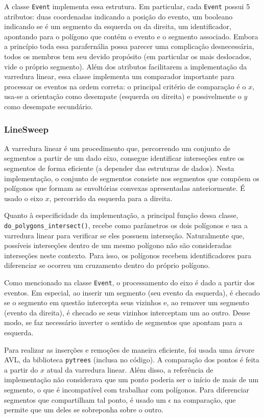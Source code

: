 \documentclass{article}
\begin{document}
A classe \texttt{Event} implementa essa estrutura. Em particular, cada \texttt{Event} possui 5 atributos: duas coordenadas indicando a posição do evento, um booleano indicando se é um segmento da esquerda ou da direita, um identificador, apontando para o polígono que contém o evento e o segmento associado. Embora a princípio toda essa parafernália possa parecer uma complicação desnecessária, todos os membros tem seu devido propósito (em particular os mais deslocados, vide o próprio segmento). Além dos atributos facilitarem a implementação da varredura linear, essa classe implementa um comparador importante para processar os eventos na ordem correta: o principal critério de comparação é o \( x \), usa-se a orientação como desempate (esquerda ou direita) e possivelmente o \( y \) como desempate secundário.

\subsubsection{LineSweep}

A varredura linear é um procedimento que, percorrendo um conjunto de segmentos a partir de um dado eixo, consegue identificar interseções entre os segmentos de forma eficiente (a depender das estruturas de dados). Nesta implementação, o conjunto de segmentos consiste nos segmentos que compõem os polígonos que formam as envoltórias convexas apresentadas anteriormente. É usado o eixo \( x \), percorrido da esquerda para a direita.

Quanto à especificidade da implementação, a principal função dessa classe, \texttt{do\_polygons\_intersect()}, recebe como parâmetros os dois polígonos e usa a varredura linear para verificar se eles possuem interseção. Naturalmente que, possíveis interseções dentro de um mesmo polígono não são consideradas interseções neste contexto. Para isso, os polígonos recebem identificadores para diferenciar se ocorreu um cruzamento dentro do próprio polígono.

Como mencionado na classe \texttt{Event}, o processamento do eixo é dado a partir dos eventos. Em especial, ao inserir um segmento (seu evento da esquerda), é checado se o segmento em questão intercepta seus vizinhos e, ao remover um segmento (evento da direita), é checado se seus vizinhos interceptam um ao outro. Desse modo, se faz necessário inverter o sentido de segmentos que apontam para a esquerda.

Para realizar as inserções e remoções de maneira eficiente, foi usada uma árvore AVL, da biblioteca \texttt{pytrees} (inclusa no código). A comparação dos pontos é feita a partir do \( x \) atual da varredura linear. Além disso, a referência de implementação não considerava que um ponto poderia ser o início de mais de um segmento, o que é incompatível com trabalhar com polígonos. Para diferenciar segmentos que compartilham tal ponto, é usado um \( \epsilon \) na comparação, que permite que um deles se sobreponha sobre o outro.
\end{document}
